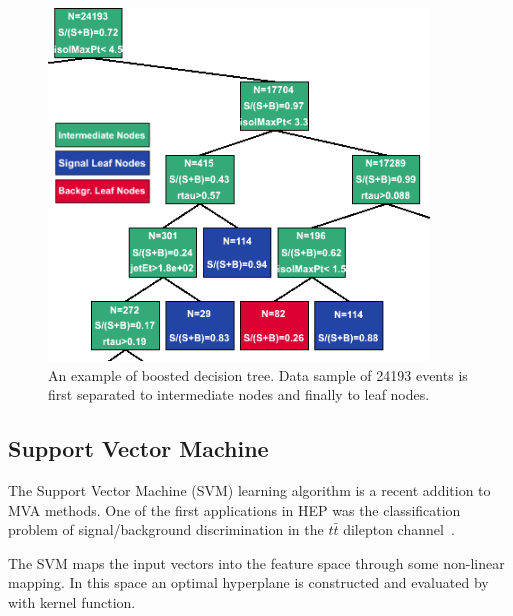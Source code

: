 \documentclass[a4paper]{jpconf}
\begin{document}


\begin{figure}[h]
 \begin{minipage}{9.0cm}
\includegraphics[width=0.9\textwidth]{images/bdt.png}
\end{minipage}
\begin{minipage}{6.0cm}
\caption{An example of boosted decision tree. 
Data sample of 24193 events is first separated to intermediate nodes and finally to leaf nodes.}
  \label{fig:bdt}
\end{minipage}
\end{figure}


\subsection{Support Vector Machine}
The Support Vector Machine (SVM) learning algorithm is a recent addition to MVA methods.
One of the first applications in HEP was the classification problem 
of signal/background discrimination in the $t\bar{t}$ dilepton channel~\cite{svmtt}.


The SVM maps the input vectors into the feature space through some
non-linear mapping. 
In this space an optimal hyperplane is constructed  and evaluated by with kernel function.
\end{document}
